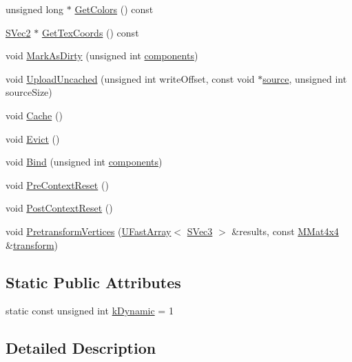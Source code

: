 \begin{CompactItemize}
\item 
unsigned long $\ast$ \hyperlink{class_gr_mesh_v_b_0caa0721a0588ac2a22980ba8059d8a9}{GetColors} () const 
\item 
\hyperlink{struct_s_vec2}{SVec2} $\ast$ \hyperlink{class_gr_mesh_v_b_da0cf2fb2929b3f307067f3ec4a7f298}{GetTexCoords} () const 
\item 
void \hyperlink{class_gr_mesh_v_b_c30d2e051d289b7142588421ba53154d}{MarkAsDirty} (unsigned int \hyperlink{glext__bak_8h_452b9ab10170c96a9bef2657c036a2c0}{components})
\item 
void \hyperlink{class_gr_mesh_v_b_a9fc0e3fbcc1d0aeaba5b489ed72f8af}{UploadUncached} (unsigned int writeOffset, const void $\ast$\hyperlink{glext__bak_8h_fd3b198d09b41a863127e5e2b29c4e53}{source}, unsigned int sourceSize)
\item 
void \hyperlink{class_gr_mesh_v_b_d89095e9dbcb97718889fc4096c5a9d2}{Cache} ()
\item 
void \hyperlink{class_gr_mesh_v_b_ee65428228e554cd769c6b0af3ff9c13}{Evict} ()
\item 
void \hyperlink{class_gr_mesh_v_b_0be3a29d9a24b3766140acaa31f5064d}{Bind} (unsigned int \hyperlink{glext__bak_8h_452b9ab10170c96a9bef2657c036a2c0}{components})
\item 
void \hyperlink{class_gr_mesh_v_b_ee2b47b8a2756a126ad6cb9dd42584fa}{PreContextReset} ()
\item 
void \hyperlink{class_gr_mesh_v_b_63b7a4882edf12152408e75e19d4df90}{PostContextReset} ()
\item 
void \hyperlink{class_gr_mesh_v_b_00dead254e2ce78b7929a3daa3556a08}{PretransformVertices} (\hyperlink{class_u_fast_array}{UFastArray}$<$ \hyperlink{struct_s_vec3}{SVec3} $>$ \&results, const \hyperlink{class_m_mat4x4}{MMat4x4} \&\hyperlink{glext__bak_8h_07993c0d92c1aeeb357ba0495c8b5325}{transform})
\end{CompactItemize}
\subsection*{Static Public Attributes}
\begin{CompactItemize}
\item 
static const unsigned int \hyperlink{class_gr_mesh_v_b_2af3fdf0087d2543d2861bd677139cdc}{kDynamic} = 1
\end{CompactItemize}


\subsection{Detailed Description}


